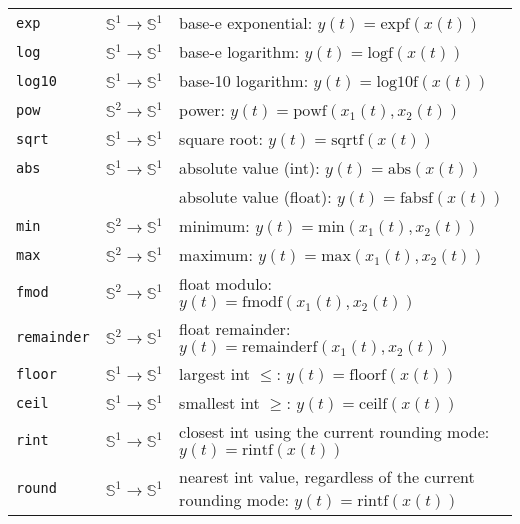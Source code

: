 \begin{tabular}{|l|l|l|}
	\texttt{exp}       & $\mathbb{S}^{1}\rightarrow\mathbb{S}^{1}$ & base-e exponential: $y(t)=\mathrm{expf}(x(t))$                                          \\
	\texttt{log}       & $\mathbb{S}^{1}\rightarrow\mathbb{S}^{1}$ & base-e logarithm: $y(t)=\mathrm{logf}(x(t))$                                            \\
	\texttt{log10}     & $\mathbb{S}^{1}\rightarrow\mathbb{S}^{1}$ & base-10 logarithm: $y(t)=\mathrm{log10f}(x(t))$                                         \\
	\texttt{pow}       & $\mathbb{S}^{2}\rightarrow\mathbb{S}^{1}$ & power: $y(t)=\mathrm{powf}(x_{1}(t),x_{2}(t))$                                          \\
	\texttt{sqrt}      & $\mathbb{S}^{1}\rightarrow\mathbb{S}^{1}$ & square root: $y(t)=\mathrm{sqrtf}(x(t))$                                                \\
	\texttt{abs}       & $\mathbb{S}^{1}\rightarrow\mathbb{S}^{1}$ & absolute value (int): $y(t)=\mathrm{abs}(x(t))$                                         \\
	                   &                                           & absolute value (float): $y(t)=\mathrm{fabsf}(x(t))$                                     \\
	\texttt{min}       & $\mathbb{S}^{2}\rightarrow\mathbb{S}^{1}$ & minimum: $y(t)=\mathrm{min}(x_{1}(t),x_{2}(t))$                                         \\
	\texttt{max}       & $\mathbb{S}^{2}\rightarrow\mathbb{S}^{1}$ & maximum: $y(t)=\mathrm{max}(x_{1}(t),x_{2}(t))$                                         \\
	\texttt{fmod}      & $\mathbb{S}^{2}\rightarrow\mathbb{S}^{1}$ & float modulo: $y(t)=\mathrm{fmodf}(x_{1}(t),x_{2}(t))$                                  \\
	\texttt{remainder} & $\mathbb{S}^{2}\rightarrow\mathbb{S}^{1}$ & float remainder: $y(t)=\mathrm{remainderf}(x_{1}(t),x_{2}(t))$                          \\

	\texttt{floor}     & $\mathbb{S}^{1}\rightarrow\mathbb{S}^{1}$ & largest int $\leq$: $y(t)=\mathrm{floorf}(x(t))$                                        \\
	\texttt{ceil}      & $\mathbb{S}^{1}\rightarrow\mathbb{S}^{1}$ & smallest int $\geq$: $y(t)=\mathrm{ceilf}(x(t))$                                        \\
	\texttt{rint}      & $\mathbb{S}^{1}\rightarrow\mathbb{S}^{1}$ & closest int using the current rounding mode: $y(t)=\mathrm{rintf}(x(t))$                \\
	\texttt{round}     & $\mathbb{S}^{1}\rightarrow\mathbb{S}^{1}$ & nearest int value, regardless of the current rounding mode: $y(t)=\mathrm{rintf}(x(t))$ \\

	\hline
\end{tabular}
\bigskip

